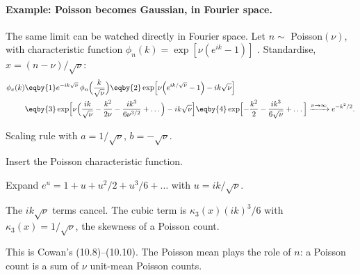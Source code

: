 \paragraph{Example: Poisson becomes Gaussian, in Fourier space.}
\label{2b:ex:cowan-poisson}
The same limit can be watched directly in Fourier space. Let $n\sim$ Poisson$(\nu)$, with characteristic function $\phi_n(k)=\exp[\nu(e^{ik}-1)]$ . Standardise, $x=(n-\nu)/\sqrt\nu$:
\begin{align*}
  \phi_x(k)
  &\eqby{1} e^{-ik\sqrt\nu}\,\phi_n\Bigl(\frac{k}{\sqrt\nu}\Bigr)
  \eqby{2} \exp\Bigl[\nu\Bigl(e^{ik/\sqrt\nu}-1\Bigr)-ik\sqrt\nu\Bigr] \\
  &\eqby{3} \exp\Bigl[\nu\Bigl(\frac{ik}{\sqrt\nu}-\frac{k^2}{2\nu}-\frac{ik^3}{6\nu^{3/2}}+\dots\Bigr)-ik\sqrt\nu\Bigr]
  \eqby{4} \exp\Bigl[-\frac{k^2}{2}-\frac{ik^3}{6\sqrt\nu}+\dots\Bigr]\xrightarrow{\nu\to\infty}e^{-k^2/2} .
\end{align*}
\begin{explain}
  \item Scaling rule with $a=1/\sqrt\nu$, $b=-\sqrt\nu$.
  \item Insert the Poisson characteristic function.
  \item Expand $e^{u}=1+u+u^2/2+u^3/6+\dots$ with $u=ik/\sqrt\nu$.
  \item The $ik\sqrt\nu$ terms cancel. The cubic term is $\kappa_3(x)(ik)^3/6$ with $\kappa_3(x)=1/\sqrt\nu$, the skewness of a Poisson count.
\end{explain}
This is Cowan's (10.8)--(10.10). The Poisson mean plays the role of $n$: a Poisson count is a sum of $\nu$ unit-mean Poisson counts.

